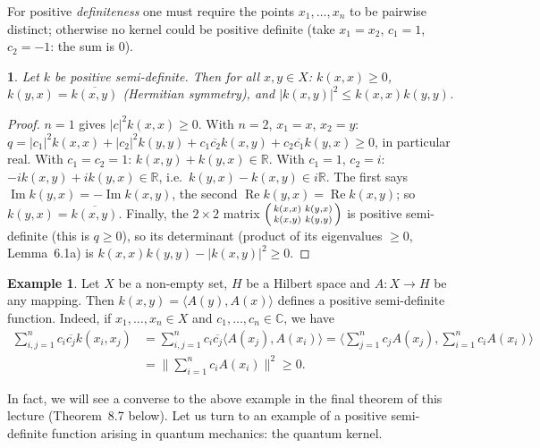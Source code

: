 \documentclass[11pt,a4paper]{article}
\numberwithin{equation}{section}
\newcommand{\R}{\mathbb{R}}
\newcommand{\C}{\mathbb{C}}
\newcommand{\ip}[2]{\langle #1, #2\rangle}
\newcommand{\conj}[1]{\overline{#1}}
\DeclareMathOperator{\Real}{Re}
\DeclareMathOperator{\Imag}{Im}
\theoremstyle{plain}
\theoremstyle{definition}
\newtheorem{example}[theorem]{Example}
\newcommand{\thistheoremname}{}
\theoremstyle{plain}
\newtheorem*{addedthm*}{\thistheoremname}
\theoremstyle{definition}
\newenvironment{addedthm}[1]{\renewcommand{\thistheoremname}{#1}\begin{addedthm*}}{\end{addedthm*}}
\begin{document}
\begin{correction}[(Def.~8.1)]
For positive \emph{definiteness} one must require the points $x_1,\dots,x_n$ to be pairwise
distinct; otherwise no kernel could be positive definite (take $x_1=x_2$, $c_1=1$,
$c_2=-1$: the sum is $0$).
\end{correction}

\begin{addedthm}{Lemma 8.1a}
Let $k$ be positive semi-definite. Then for all $x,y\in X$:
$k(x,x)\ge0$, $k(y,x)=\conj{k(x,y)}$ (Hermitian symmetry), and
$|k(x,y)|^2\le k(x,x)k(y,y)$.
\end{addedthm}
\begin{proof}
$n=1$ gives $|c|^2k(x,x)\ge0$. With $n=2$, $x_1=x$, $x_2=y$:
$q=|c_1|^2k(x,x)+|c_2|^2k(y,y)+c_1\conj{c_2}k(x,y)+c_2\conj{c_1}k(y,x)\ge0$, in particular
real. With $c_1=c_2=1$: $k(x,y)+k(y,x)\in\R$. With $c_1=1$, $c_2=i$:
$-ik(x,y)+ik(y,x)\in\R$, i.e.\ $k(y,x)-k(x,y)\in i\R$. The first says
$\Imag k(y,x)=-\Imag k(x,y)$, the second $\Real k(y,x)=\Real k(x,y)$; so
$k(y,x)=\conj{k(x,y)}$. Finally, the $2\times2$ matrix
$\begin{psmallmatrix}k(x,x)&k(y,x)\\k(x,y)&k(y,y)\end{psmallmatrix}$ is positive
semi-definite (this is $q\ge0$), so its determinant (product of its eigenvalues $\ge0$,
Lemma~6.1a) is $k(x,x)k(y,y)-|k(x,y)|^2\ge0$.
\end{proof}

\begin{example}\label{ex:feature}
Let $X$ be a non-empty set, $H$ be a Hilbert space and $A:X\to H$ be any mapping. Then
$k(x,y)=\ip{A(y)}{A(x)}$ defines a positive semi-definite function. Indeed, if
$x_1,\dots,x_n\in X$ and $c_1,\dots,c_n\in\C$, we have
\begin{align*}
\sum_{i,j=1}^nc_i\conj{c_j}k(x_i,x_j)&=\sum_{i,j=1}^nc_i\conj{c_j}\ip{A(x_j)}{A(x_i)}
=\Big\langle\sum_{j=1}^nc_jA(x_j),\sum_{i=1}^nc_iA(x_i)\Big\rangle\\
&=\Big\|\sum_{i=1}^nc_iA(x_i)\Big\|^2\ge0 .
\end{align*}
\end{example}

In fact, we will see a converse to the above example in the final theorem of this lecture
(Theorem~8.7 below). Let us turn to an example of a positive semi-definite function arising
in quantum mechanics: the quantum kernel.
\end{document}

